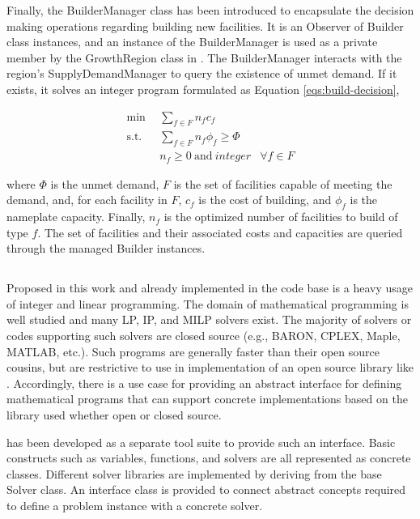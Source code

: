 Finally, the BuilderManager class has been introduced to encapsulate the
decision making operations regarding building new facilities. It is an Observer
of Builder class instances, and an instance of the BuilderManager is used as a
private member by the GrowthRegion class in \Cycamore. The BuilderManager
interacts with the region's SupplyDemandManager to query the existence of unmet
demand. If it exists, it solves an integer program formulated as Equation
\ref{eqs:build-decision},

\begin{subequations}\label{eqs:build-decision}
  \begin{align}
    \min \:\: & 
    \sum_{f \in F} n_f c_f
    & \\
    \text{s.t.} \:\: &
    \sum_{f \in F} n_f \phi_f \ge \Phi
    & \\
    &
    n_f \geq 0 \: \text{and} \: integer
    &
    \forall f \in F
  \end{align}
\end{subequations}
  
where $\Phi$ is the unmet demand, $F$ is the set of facilities capable of
meeting the demand, and, for each facility in $F$, $c_f$ is the cost of
building, and $\phi_f$ is the nameplate capacity.  Finally, $n_f$ is the
optimized number of facilities to build of type $f$. The set of facilities and
their associated costs and capacities are queried through the managed Builder
instances.

\subsection{\Cyclopts}

Proposed in this work and already implemented in the \Cyclus code base is a
heavy usage of integer and linear programming. The domain of mathematical
programming is well studied and many LP, IP, and MILP solvers exist. The
majority of solvers or codes supporting such solvers are closed source (e.g.,
BARON, CPLEX, Maple, MATLAB, etc.). Such programs are generally faster than
their open source cousins, but are restrictive to use in implementation of an
open source library like \Cyclus. Accordingly, there is a use case for providing
an abstract interface for defining mathematical programs that can support
concrete implementations based on the library used whether open or closed
source.

\Cyclopts has been developed as a separate tool suite to provide such an
interface. Basic constructs such as variables, functions, and solvers are all
represented as concrete classes. Different solver libraries are implemented by
deriving from the base Solver class. An interface class is provided to connect
abstract concepts required to define a problem instance with a concrete solver.

